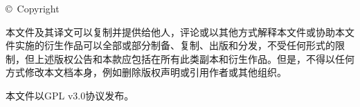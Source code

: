 \begin{flushleft}
    \copyright~Copyright~\the\year~\DICTDocAuthor
\end{flushleft}
本文件及其译文可以复制并提供给他人，评论或以其他方式解释本文件或协助本文件实施的衍生作品可以全部或部分制备、复制、出版和分发，不受任何形式的限制，但上述版权公告和本款应包括在所有此类副本和衍生作品。但是，不得以任何方式修改本文档本身，例如删除版权声明或引用作者或其他组织。
\par 
本文件以GPL v3.0协议发布。